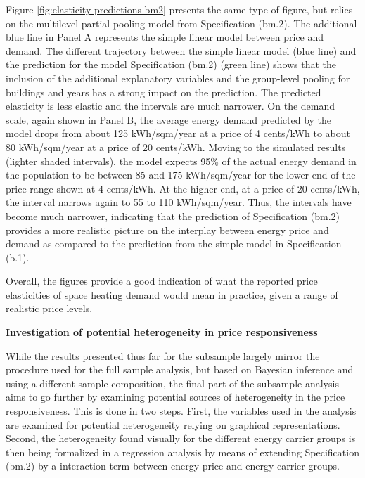 \documentclass[12pt,twoside]{reedthesis}
\begin{document}
Figure \ref{fig:elasticity-predictions-bm2} presents the same type of figure, but relies on the multilevel partial pooling model from Specification (bm.2). The additional blue line in Panel A represents the simple linear model between price and demand. The different trajectory between the simple linear model (blue line) and the prediction for the model Specification (bm.2) (green line) shows that the inclusion of the additional explanatory variables and the group-level pooling for buildings and years has a strong impact on the prediction. The predicted elasticity is less elastic and the intervals are much narrower. On the demand scale, again shown in Panel B, the average energy demand predicted by the model drops from about 125 kWh/sqm/year at a price of 4 cents/kWh to about 80 kWh/sqm/year at a price of 20 cents/kWh. Moving to the simulated results (lighter shaded intervals), the model expects 95\% of the actual energy demand in the population to be between 85 and 175 kWh/sqm/year for the lower end of the price range shown at 4 cents/kWh. At the higher end, at a price of 20 cents/kWh, the interval narrows again to 55 to 110 kWh/sqm/year. Thus, the intervals have become much narrower, indicating that the prediction of Specification (bm.2) provides a more realistic picture on the interplay between energy price and demand as compared to the prediction from the simple model in Specification (b.1).

Overall, the figures provide a good indication of what the reported price elasticities of space heating demand would mean in practice, given a range of realistic price levels.

\textbf{Investigation of potential heterogeneity in price responsiveness}

While the results presented thus far for the subsample largely mirror the procedure used for the full sample analysis, but based on Bayesian inference and using a different sample composition, the final part of the subsample analysis aims to go further by examining potential sources of heterogeneity in the price responsiveness. This is done in two steps. First, the variables used in the analysis are examined for potential heterogeneity relying on graphical representations. Second, the heterogeneity found visually for the different energy carrier groups is then being formalized in a regression analysis by means of extending Specification (bm.2) by a interaction term between energy price and energy carrier groups.
\end{document}

